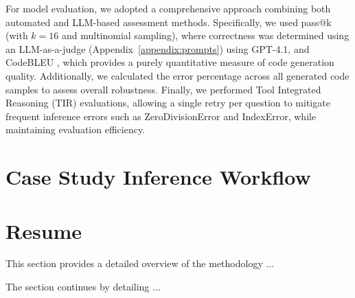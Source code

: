 For model evaluation, we adopted a comprehensive approach combining both automated and LLM-based assessment methods. Specifically, we used pass@k \citep{Levi2024SimpleModelInferenceScalingLaws} (with $k=16$ and multinomial sampling), where correctness was determined using an LLM-as-a-judge \citep{Li2025LLMJudge} (Appendix~\ref{appendix:prompts}) using GPT-4.1, and CodeBLEU \citep{Ren2020CodeBLEU}, which provides a purely quantitative measure of code generation quality. Additionally, we calculated the error percentage across all generated code samples to assess overall robustness. Finally, we performed Tool Integrated Reasoning (TIR) \citep{Fleureau2024NuminaMath} evaluations, allowing a single retry per question to mitigate frequent inference errors such as ZeroDivisionError and IndexError, while maintaining evaluation efficiency.






\section{Case Study Inference Workflow}


\section{Resume}

This section provides a detailed overview of the methodology ...

The section continues by detailing ...
